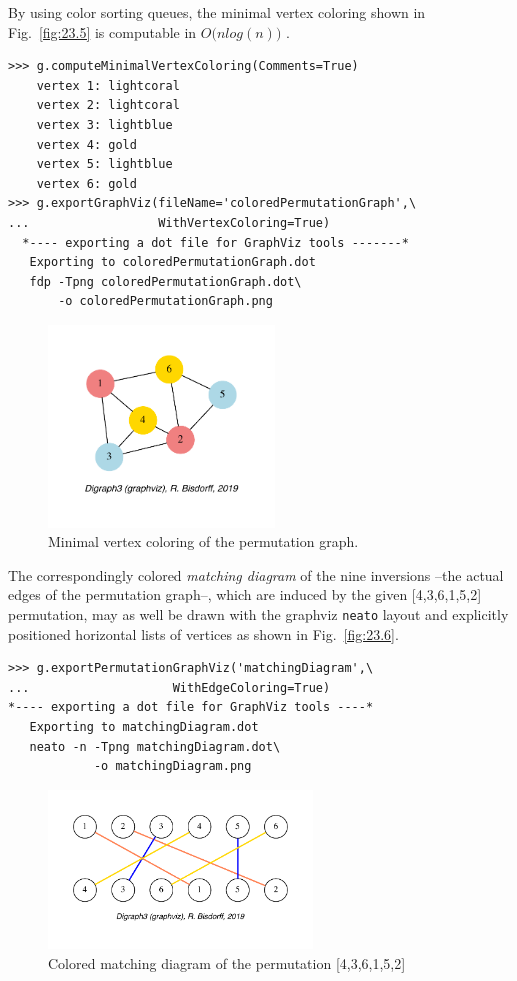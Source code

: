 By using color sorting queues, the minimal vertex coloring shown in Fig.~\vref{fig:23.5} is computable in $O\big(n log(n)\big)$ \citep{GOL-2004}.
\begin{lstlisting}
>>> g.computeMinimalVertexColoring(Comments=True)
    vertex 1: lightcoral
    vertex 2: lightcoral
    vertex 3: lightblue
    vertex 4: gold
    vertex 5: lightblue
    vertex 6: gold
>>> g.exportGraphViz(fileName='coloredPermutationGraph',\
...                  WithVertexColoring=True)
  *---- exporting a dot file for GraphViz tools -------*
   Exporting to coloredPermutationGraph.dot
   fdp -Tpng coloredPermutationGraph.dot\
       -o coloredPermutationGraph.png
\end{lstlisting}
\begin{figure}[h]
\sidecaption[t]
\includegraphics[width=6cm]{Figures/23-5-coloredPermutationGraph.pdf}
\caption{Minimal vertex coloring of the permutation graph.} 
\label{fig:23.5}       %
\end{figure}

The correspondingly colored \emph{matching diagram} of the nine inversions --the actual edges of the permutation graph--, which are induced by the given [4,3,6,1,5,2] permutation, may as well be drawn with the graphviz \texttt{neato} layout and explicitly positioned horizontal lists of vertices as shown in Fig.~\vref{fig:23.6}.
\begin{lstlisting}
>>> g.exportPermutationGraphViz('matchingDiagram',\
...                    WithEdgeColoring=True)
*---- exporting a dot file for GraphViz tools ----*
   Exporting to matchingDiagram.dot
   neato -n -Tpng matchingDiagram.dot\
            -o matchingDiagram.png
\end{lstlisting}
\begin{figure}[h]
\sidecaption[t]
\includegraphics[width=7cm]{Figures/23-6-perm_permutationGraph.pdf}
\caption{Colored matching diagram of the permutation [4,3,6,1,5,2]} 
\label{fig:23.6}       %
\end{figure}

